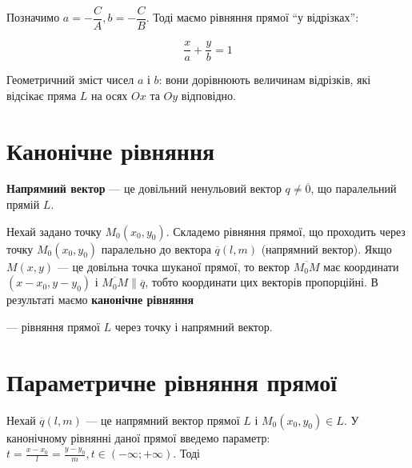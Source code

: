 Позначимо $a = -\dfrac{C}{A}, b = -\dfrac{C}{B}$. Тоді маємо рівняння прямої “у відрізках”:

$$\dfrac{x}{a} + \dfrac{y}{b} = 1$$

Геометричний зміст чисел $a$ і $b$: вони дорівнюють величинам відрізків, які
відсікає пряма $L$ на осях $Ox$ та $Oy$ відповідно.

\section{Канонічне рівняння}

\begin{definition}
	\textbf{Напрямний вектор} --- це довільний ненульовий вектор $q \neq \overline{0}$, що паралельний прямій $L$.
\end{definition}

\parbox{100px}{}
\parbox{8.6cm}{
	Нехай задано точку $M_0(x_0, y_0)$. Складемо рівняння
	прямої, що проходить через точку $M_0(x_0, y_0)$
	паралельно до вектора $\overline{q}(l,m)$ (напрямний вектор).
	Якщо $M(x, y)$ --- це довільна точка шуканої прямої, то
	вектор $\overline{M_0M}$ має координати $(x-x_0, y-y_0)$ і $\overline{M_0M} \parallel \overline{q}$, тобто координати цих
	векторів пропорційні. В результаті маємо \textbf{канонічне рівняння}
}	
	
	\begin{center}
	\end{center}
	 --- рівняння прямої $L$ через точку і напрямний вектор.


\section{Параметричне рівняння прямої}

Нехай $\overline{q}(l, m)$ --- це напрямний вектор прямої $L$ і $M_0(x_0, y_0) \in L$. У канонічному
рівнянні даної прямої введемо параметр: $t = \frac{x-x_0}{l} = \frac{y-y_0}{m}, t \in (-\infty; +\infty)$. Тоді

